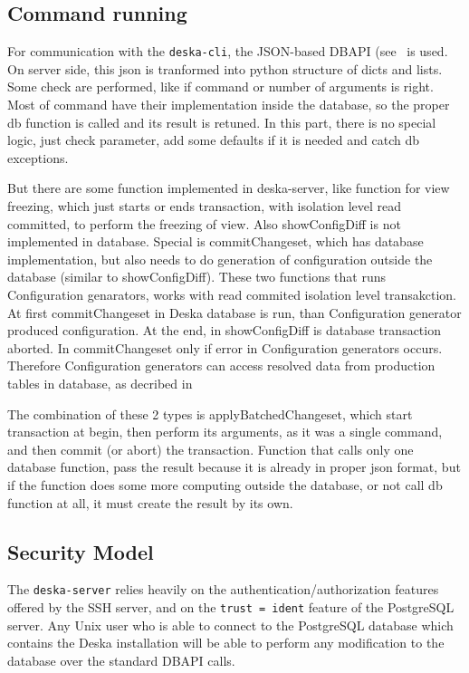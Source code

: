 \documentclass[deska]{subfiles}
\begin{document}
\subsection{Command running}
For communication with the {\tt deska-cli}, the JSON-based DBAPI (see~ is used. On server side, this json is tranformed into python structure of dicts and lists. Some check are performed, like if command or number of arguments is right.
Most of command have their implementation inside the database, so the proper db function is called and its result is retuned. In this part, there is no special logic, just check parameter, add some defaults if it is needed and catch db exceptions.

But there are some function implemented in deska-server, like function for view freezing, which just starts or ends transaction, with isolation
level read committed, to perform the freezing of view.
Also showConfigDiff is not implemented in database. Special is commitChangeset, which has database implementation,
but also needs to do generation of configuration outside the database (similar to showConfigDiff).
These two functions that runs Configuration genarators, works with read commited isolation level transakction.
At first commitChangeset in Deska database is run, than Configuration generator produced configuration.
At the end, in showConfigDiff is database transaction aborted. In commitChangeset only if error in
Configuration generators occurs. Therefore Configuration generators can access resolved data from
production tables in database, as decribed in 

The combination of these 2 types is applyBatchedChangeset, which start transaction at begin, then perform its arguments, as it was a single
command, and then commit (or abort) the transaction. 
Function that calls only one database function, pass the result because it is already in proper json format, but if the function does some
more computing outside the database, or not call db function at all, it must create the result by its own.

\subsection{Security Model}
\label{sec:server-security-model}

The {\tt deska-server} relies heavily on the authentication/authorization features offered by the SSH server, and on the
{\tt trust = ident} feature of the PostgreSQL server.  Any Unix user who is able to connect to the PostgreSQL database
which contains the Deska installation will be able to perform any modification to the database over the standard DBAPI
calls.
\end{document}
